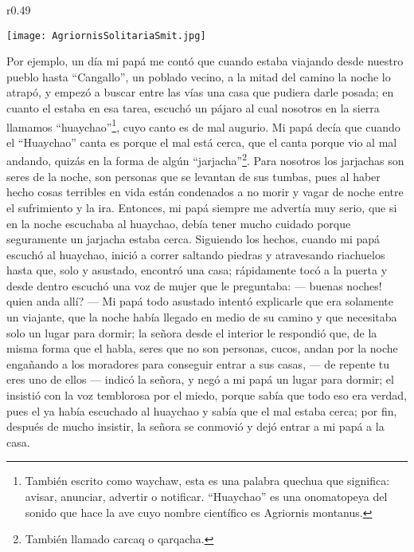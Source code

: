 \begin{wrapfigure}{r}{0.49\textwidth}
  \begin{center}
  \vspace{-20pt}
    \texttt{[image: AgriornisSolitariaSmit.jpg]}
  \end{center}
  \vspace{-20pt}
\end{wrapfigure}
Por ejemplo, un día mi papá me contó que cuando estaba viajando desde nuestro pueblo hasta ``Cangallo'', un poblado vecino, a la mitad del camino la noche lo atrapó, y empezó a buscar entre las vías una casa que pudiera darle posada; en cuanto el estaba en esa tarea, escuchó un pájaro al cual nosotros en la sierra llamamos ``huaychao''\footnote{También escrito como waychaw, esta es una palabra quechua que significa: avisar, anunciar, advertir o notificar. ``Huaychao'' es una onomatopeya del sonido que hace la ave cuyo nombre científico es Agriornis montanus.}, cuyo canto es de mal augurio.
Mi papá decía que cuando el ``Huaychao'' canta es porque el mal está cerca, que el canta porque vio al mal andando, quizás en la forma de algún ``jarjacha''\footnote{También llamado carcaq o qarqacha.}. Para nosotros los jarjachas son seres de la noche, son personas que se levantan de sus tumbas, pues al haber hecho cosas terribles en vida están condenados a no morir y vagar de noche entre el sufrimiento y la ira.
Entonces, mi papá siempre me advertía muy serio, que si en la noche escuchaba al huaychao, debía tener mucho cuidado porque seguramente un jarjacha estaba cerca.
Siguiendo los hechos, cuando mi papá escuchó al huaychao, inició a correr saltando piedras y atravesando riachuelos hasta que, solo y asustado, encontró una casa; rápidamente tocó a la puerta y desde dentro escuchó una voz de mujer que le preguntaba: --- buenas noches! quien anda allí? ---
Mi papá todo asustado intentó explicarle que era solamente un viajante, que la noche había llegado en medio de su camino y que necesitaba solo un lugar para dormir; la señora desde el interior le respondió que, de la misma forma que el habla, seres que no son personas, cucos, andan por la noche engañando a los moradores para conseguir entrar a sus casas, --- de repente tu eres uno de ellos --- indicó la señora, y negó a mi papá un lugar para dormir; el insistió con la voz temblorosa por el miedo, porque sabía que todo eso era verdad, pues el ya había escuchado al huaychao y sabía que el mal estaba cerca; por fin, después de mucho insistir, la señora se conmovió y dejó entrar a mi papá a la casa.
